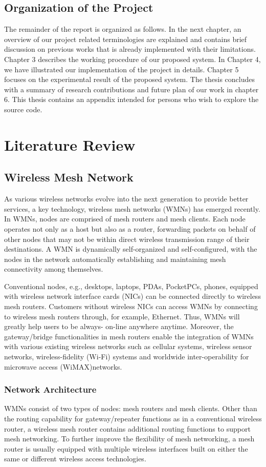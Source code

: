 \documentclass[12pt,a4paper]{report}
\begin{document}
\section{Organization of the Project}
The remainder of the report is organized as follows. In the next chapter, an overview of our project related terminologies are explained and contains brief discussion on previous works that is already implemented with their limitations. Chapter 3 describes the working procedure of our proposed system. In Chapter 4, we have illustrated our implementation of the project in details. Chapter 5 focuses on the experimental result of the proposed system. The thesis concludes with a summary of research contributions and future plan of our work in chapter 6. This thesis contains an appendix intended for persons who wish to explore the source code. 
\chapter{Literature Review}

\section{Wireless Mesh Network}
As various wireless networks evolve into the next generation to provide better services, a key technology, wireless mesh networks (WMNs) has emerged recently. In WMNs, nodes are comprised of mesh routers and mesh clients. Each node operates not only as a host but
also as a router, forwarding packets on behalf of other nodes that may not be within direct
wireless transmission range of their destinations. A WMN is dynamically self-organized and self-configured, with the nodes in the network automatically establishing and maintaining
mesh connectivity among themselves. 

Conventional nodes, e.g., desktops, laptops, PDAs, PocketPCs, phones, equipped with
wireless network interface cards (NICs) can be connected directly to wireless mesh routers.
Customers without wireless NICs can access WMNs by connecting to wireless mesh
routers through, for example, Ethernet. Thus, WMNs will greatly help users to be always-
on-line anywhere anytime. Moreover, the gateway/bridge functionalities in mesh routers
enable the integration of WMNs with various existing wireless networks such as cellular
systems, wireless sensor networks, wireless-fidelity (Wi-Fi) systems and worldwide
inter-operability for microwave access (WiMAX)networks.


\subsection{Network Architecture}
WMNs consist of two types of nodes: mesh routers and mesh clients. Other than the routing
capability for gateway/repeater functions as in a conventional wireless router, a wireless mesh
router contains additional routing functions to support mesh networking. To further improve
the flexibility of mesh networking, a mesh router is usually equipped with multiple wireless
interfaces built on either the same or different wireless access technologies.
\end{document}
